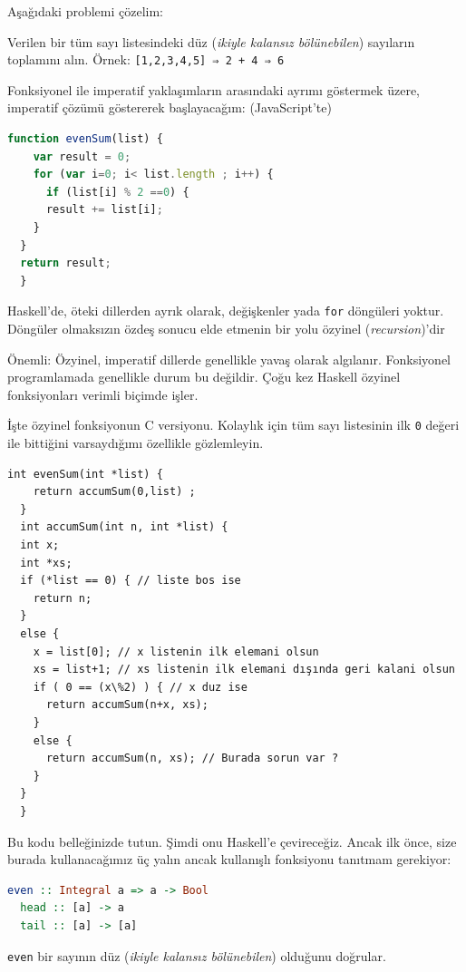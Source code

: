 \documentclass[a4paper,14pt,openany]{extbook} %
\let\emph\textit
\begin{document}
Aşağıdaki problemi çözelim:

Verilen bir tüm sayı listesindeki düz (\emph{ikiyle kalansız bölünebilen}) sayıların toplamını alın. Örnek: \lstinline![1,2,3,4,5] ⇒ 2 + 4 ⇒ 6!

Fonksiyonel ile imperatif yaklaşımların arasındaki ayrımı göstermek üzere,
imperatif çözümü göstererek başlayacağım: (JavaScript'te)

\begin{lstlisting}[language=Javascript]
  function evenSum(list) {
    var result = 0;
    for (var i=0; i< list.length ; i++) {
      if (list[i] % 2 ==0) {
      result += list[i];
    }
  }
  return result;
  }
\end{lstlisting}

Haskell'de, öteki dillerden ayrık olarak, değişkenler yada \lstinline!for! döngüleri
yoktur. Döngüler olmaksızın özdeş sonucu elde etmenin bir yolu
özyinel (\emph{recursion})'dir

Önemli: Özyinel, imperatif dillerde genellikle yavaş olarak algılanır.
Fonksiyonel programlamada genellikle durum bu değildir. Çoğu kez %
Haskell özyinel fonksiyonları verimli biçimde işler.

İşte özyinel fonksiyonun C versiyonu. Kolaylık %
için tüm sayı listesinin ilk \lstinline!0! değeri ile bittiğini
varsaydığımı özellikle gözlemleyin.

\begin{lstlisting}[language= {[ANSI]C},tabsize=2,escapeinside=||]
  int evenSum(int *list) {
    return accumSum(0,list) ;
  }
  int accumSum(int n, int *list) {
  int x;
  int *xs;
  if (*list == 0) { // liste bos ise
    return n;
  }
  else {
    x = list[0]; // x listenin ilk elemani olsun
    xs = list+1; // xs listenin ilk elemani dışında geri kalani olsun
    if ( 0 == (x\%2) ) { // x duz ise
      return accumSum(n+x, xs);
    }
    else {
      return accumSum(n, xs); // Burada sorun var ?
    }
  }
  }
\end{lstlisting}

Bu kodu belleğinizde tutun. Şimdi onu Haskell'e çevireceğiz. Ancak ilk önce,
size burada kullanacağımız üç yalın ancak kullanışlı fonksiyonu tanıtmam
gerekiyor:

\begin{lstlisting}[language=Haskell]
  even :: Integral a => a -> Bool
  head :: [a] -> a
  tail :: [a] -> [a]
\end{lstlisting}

\lstinline!even! bir sayının düz (\emph{ikiyle kalansız bölünebilen}) olduğunu doğrular.
\end{document}
